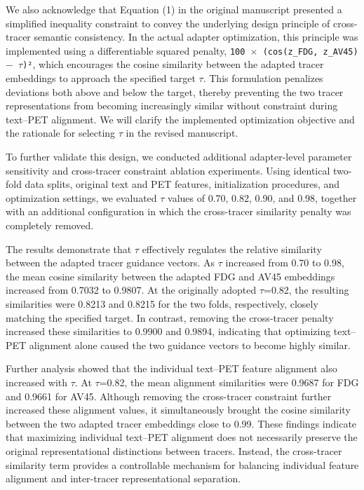 {We also acknowledge that Equation (1) in the original manuscript presented a simplified inequality constraint to convey the underlying design principle of cross-tracer semantic consistency. In the actual adapter optimization, this principle was implemented using a differentiable squared penalty, \texttt{100 \ensuremath{\times} (cos(z\_FDG, z\_AV45) \ensuremath{-} \ensuremath{\tau})²}, which encourages the cosine similarity between the adapted tracer embeddings to approach the specified target \ensuremath{\tau}. This formulation penalizes deviations both above and below the target, thereby preventing the two tracer representations from becoming increasingly similar without constraint during text–PET alignment. We will clarify the implemented optimization objective and the rationale for selecting \ensuremath{\tau} in the revised manuscript.

To further validate this design, we conducted additional adapter-level parameter sensitivity and cross-tracer constraint ablation experiments. Using identical two-fold data splits, original text and PET features, initialization procedures, and optimization settings, we evaluated \ensuremath{\tau} values of 0.70, 0.82, 0.90, and 0.98, together with an additional configuration in which the cross-tracer similarity penalty was completely removed.

The results demonstrate that \ensuremath{\tau} effectively regulates the relative similarity between the adapted tracer guidance vectors. As \ensuremath{\tau} increased from 0.70 to 0.98, the mean cosine similarity between the adapted FDG and AV45 embeddings increased from 0.7032 to 0.9807. At the originally adopted \ensuremath{\tau}=0.82, the resulting similarities were 0.8213 and 0.8215 for the two folds, respectively, closely matching the specified target. In contrast, removing the cross-tracer penalty increased these similarities to 0.9900 and 0.9894, indicating that optimizing text–PET alignment alone caused the two guidance vectors to become highly similar.

Further analysis showed that the individual text–PET feature alignment also increased with \ensuremath{\tau}. At \ensuremath{\tau}=0.82, the mean alignment similarities were 0.9687 for FDG and 0.9661 for AV45. Although removing the cross-tracer constraint further increased these alignment values, it simultaneously brought the cosine similarity between the two adapted tracer embeddings close to 0.99. These findings indicate that maximizing individual text–PET alignment does not necessarily preserve the original representational distinctions between tracers. Instead, the cross-tracer similarity term provides a controllable mechanism for balancing individual feature alignment and inter-tracer representational separation.

}
